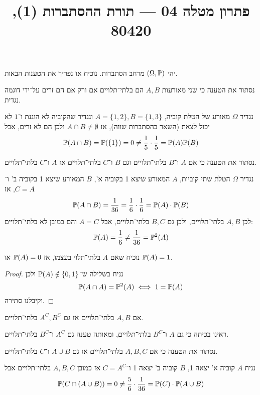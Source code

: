 
\title{פתרון מטלה 04 --- תורת ההסתברות (1), 80420}


\maketitle
\maketitleprint{}

\Question{}
יהי $(\Omega, \mathbb{P})$ מרחב הסתברות.
נוכיח או נפריך את הטענות הבאות.

\Subquestion{}
נסתור את הטענה כי שני מאורעות $A, B$ הם בלתי־תלויים אם ורק אם הם זרים על־ידי דוגמה נגדית.
\begin{solution}
	נגדיר $\Omega$ מאורע של הטלת קוביה, $A = \{ 1, 2 \}, B = \{ 1, 3 \}$ ונגדיר שהקוביה לא הוגנת ו־$1$ לא יכול לצאת (השאר בהסתברות שווה), אז $A \cap B \ne \emptyset$ ולכן הם לא זרים, אבל
	\[
		\mathbb{P}(A \cap B) = \mathbb{P}(\{ 1 \}) = 0 \ne \frac{1}{5} \cdot \frac{1}{5} = \mathbb{P}(A) \mathbb{P}(B)
	\]
\end{solution}

\Subquestion{}
נסתור את הטענה כי אם $A$ ו־$B$ בלתי־תלויים וגם $B$ ו־$C$ בלתי־תלויים אז $A$ ו־$C$ בלתי־תלויים.
\begin{solution}
	נגדיר $\Omega$ הטלת שתי קוביות, $A$ המאורע שיצא 1 בקוביה א', $B$ המאורע שיצא 1 בקוביה ב' ו־$C = A$, אז
	\[
		\mathbb{P}(A \cap B) = \frac{1}{36} = \frac{1}{6} \cdot \frac{1}{6} = \mathbb{P}(A) \cdot \mathbb{P}(B)
	\]
	לכן $A, B$ בלתי־תלויים, ולכן גם $B, C$ בלתי־תלויים, אבל $A = C$ והם כמובן לא בלתי־תלויים:
	\[
		\mathbb{P}(A) = \frac{1}{6} \ne \frac{1}{36} = \mathbb{P}^2(A)
	\]
\end{solution}

\Subquestion{}
נוכיח שאם $A$ בלתי־תלוי בעצמו, אז $\mathbb{P}(A) = 0$ או $\mathbb{P}(A) = 1$.
\begin{proof}
	נניח בשלילה ש־$\mathbb{P}(A) \notin \{0, 1\}$ ולכן
	\[
		\mathbb{P}(A \cap A) = \mathbb{P}^2(A)
		\iff
		1 = \mathbb{P}(A)
	\]
	וקיבלנו סתירה.
\end{proof}

\Subquestion{}
אם $A, B$ בלתי־תלויים אז גם $A^C, B^C$ בלתי־תלויים.
\begin{solution}
	ראינו בכיתה כי גם $A$ ו־$B^C$ בלתי־תלויים, ומאותה טענה גם $A^C$ ו־$B^C$ בלתי־תלויים.
\end{solution}

\Subquestion{}
נסתור את הטענה כי אם $A, B, C$ בלתי־תלויים אז גם $A \cup B$ ו־$C$ בלתי־תלויים.
\begin{solution}
	נניח $A$ קוביה א' יצאה 1, $B$ קוביה ב' יצאה 1 ו־$C = A^C$ אז כמובן $A, B, C$ בלתי־תלויים אבל
	\[
		\mathbb{P}(C \cap (A \cup B)) = 0 \ne \frac{5}{6} \cdot \frac{1}{36} = \mathbb{P}(C) \cdot \mathbb{P}(A \cup B)
	\]
\end{solution}

